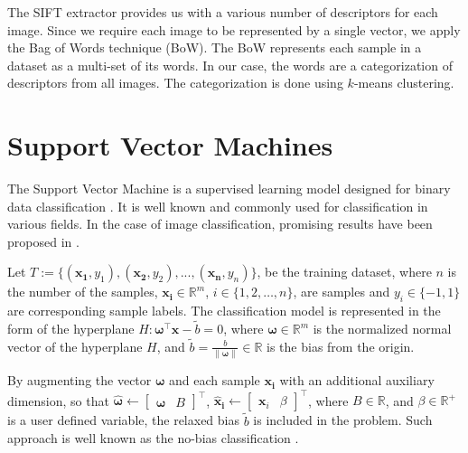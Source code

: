 \documentclass{aip-cp}
\newcommand{\norm}[1]{\left\lVert#1\right\rVert}
\begin{document}
The SIFT extractor provides us with a various number of descriptors for each image. Since we require each image to be represented by a single vector, we apply the Bag of Words technique (BoW). The BoW represents each sample in a dataset as a multi-set of its words. In our case, the words are a categorization of descriptors from all images. The categorization is done using $k$-means clustering.

\section{Support Vector Machines}
The Support Vector Machine is a supervised learning model designed for binary data classification \cite{boser1992}. It is well known and commonly used for classification in various fields. In the case of image classification, promising results have been proposed in \cite{dornak2020}.

Let $T := \{(\boldsymbol{x_1}, y_1),(\boldsymbol{x_2}, y_2),...,(\boldsymbol{x_n}, y_n)\}$,
be the training dataset, where $n$ is the number of the samples, $\boldsymbol{x_i} \in \mathbb{R}^m$, $i \in \{1,2,\dots,n\}$,
are samples and $y_i \in \{-1, 1\}$ are corresponding sample labels. The classification model is represented in the form of the hyperplane $H: \boldsymbol{\omega}^\top\boldsymbol{x}-\widetilde{b}=0$, where $\boldsymbol{\omega} \in \mathbb{R}^{m}$ is the normalized normal vector of the hyperplane $H$, and $\widetilde{b} = \frac{b}{\norm{\boldsymbol{\omega}}} \in \mathbb{R}$ is the bias from the origin.

By augmenting the vector $\boldsymbol{\omega}$ and each sample $\boldsymbol{x_i}$ with an additional auxiliary dimension, so that $\boldsymbol{\widehat{\omega}} \leftarrow \begin{bmatrix}\boldsymbol{\omega} & B \end{bmatrix}^\top$, $\boldsymbol{\widehat{x}_i} \leftarrow \begin{bmatrix}\boldsymbol{x}_i & \beta \end{bmatrix}^\top$, where $B \in \mathbb{R}$, and $\beta \in \mathbb{R}^+$ is a user defined variable, the relaxed bias $\widetilde{b}$ is included in the problem. Such approach is well known as the no-bias classification \cite{Aeta2018}.
\end{document}
